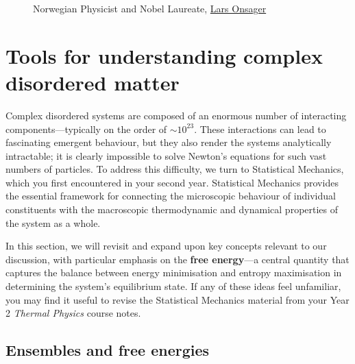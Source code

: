 \documentclass[
  letterpaper,
  enabledeprecatedfontcommands]{report}
\begin{document}
\begin{figure}
\begin{minipage}{0.50\linewidth}
{}


\end{minipage}%

\caption{\label{fig-onsager}Norwegian Physicist and Nobel Laureate,
\href{https://en.wikipedia.org/wiki/Lars_Onsager}{Lars Onsager}}

\end{figure}%

\chapter*{Tools for understanding complex disordered
matter}\label{tools-for-understanding-complex-disordered-matter}


Complex disordered systems are composed of an enormous number of
interacting components---typically on the order of \(\sim 10^{23}\).
These interactions can lead to fascinating emergent behaviour, but they
also render the systems analytically intractable; it is clearly
impossible to solve Newton's equations for such vast numbers of
particles. To address this difficulty, we turn to Statistical Mechanics,
which you first encountered in your second year. Statistical Mechanics
provides the essential framework for connecting the microscopic
behaviour of individual constituents with the macroscopic thermodynamic
and dynamical properties of the system as a whole.

In this section, we will revisit and expand upon key concepts relevant
to our discussion, with particular emphasis on the \textbf{free
energy}---a central quantity that captures the balance between energy
minimisation and entropy maximisation in determining the system's
equilibrium state. If any of these ideas feel unfamiliar, you may find
it useful to revise the Statistical Mechanics material from your Year 2
\emph{Thermal Physics} course notes.

\section*{Ensembles and free
energies}\label{ensembles-and-free-energies}
\end{document}
